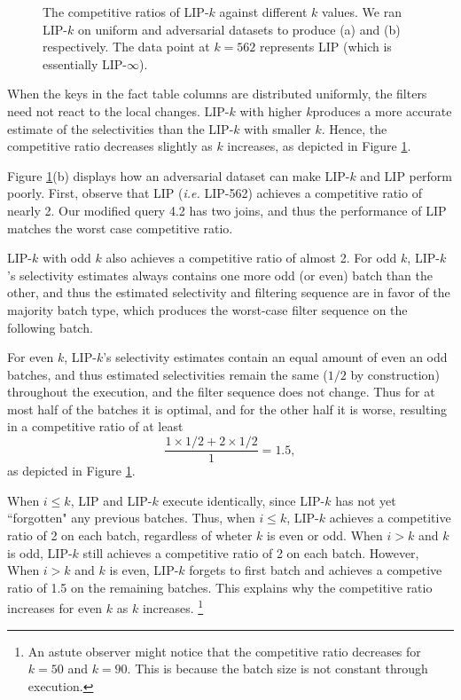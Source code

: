 \begin{figure}
    \centering

    \quad
    
    \caption{The competitive ratios of LIP-$k$ against different $k$ values. We ran LIP-$k$ on uniform and adversarial datasets to produce (a) and (b) respectively. The data point at $k = 562$ represents LIP (which is essentially LIP-$\infty$).}
    \label{fig:cr}
\end{figure}

When the keys in the fact table columns are distributed uniformly, the filters need not react to the local changes. LIP-$k$ with higher $k$produces a more accurate estimate of the selectivities than the LIP-$k$ with smaller $k$. Hence, the competitive ratio decreases slightly as $k$ increases, as depicted in Figure \ref{fig:cr}.

Figure \ref{fig:cr}(b) displays how an adversarial dataset can make LIP-$k$ and LIP perform poorly. 
First, observe that LIP ({\it i.e.} LIP-562) achieves a competitive ratio of nearly 2.
Our modified query 4.2 has two joins, and thus the performance of LIP matches the worst case competitive ratio. 

LIP-$k$ with odd $k$ also achieves a competitive ratio of almost 2. 
For odd $k$, LIP-$k$'s selectivity estimates always contains one more odd (or even) batch than the other, 
and thus the estimated selectivity and filtering sequence are in favor of the majority batch type,
which produces the worst-case filter sequence on the following batch.

For even $k$, LIP-$k$'s selectivity estimates contain an equal amount of even an odd batches,  
and thus estimated selectivities remain the same ($1/2$ by construction) throughout the execution, 
and the filter sequence does not change. Thus for at most half of the batches it is optimal, 
and for the other half it is worse, 
resulting in a competitive ratio of at least \[ \frac{1 \times 1/2 + 2 \times 1/2}{1} = 1.5,\] as depicted in Figure \ref{fig:cr}. 

When $i \leq k$, LIP and LIP-$k$ execute identically, since LIP-$k$ has not yet ``forgotten" any previous batches. 
Thus, when $i \leq k$, LIP-$k$ achieves a competitive ratio of 2 on each batch, regardless of wheter $k$ is even or odd.
When $i > k$ and $k$ is odd, LIP-$k$ still achieves a competitive ratio of 2 on each batch.
However, When $i > k$ and $k$ is even, LIP-$k$ forgets to first batch and achieves a competive ratio of 1.5 on the remaining batches.
This explains why the competitive ratio increases for even $k$ as $k$ increases.
\footnote{An astute observer might notice that the competitive ratio decreases for $k = 50$ and $k = 90$. This is because the batch size is not constant through execution.}


